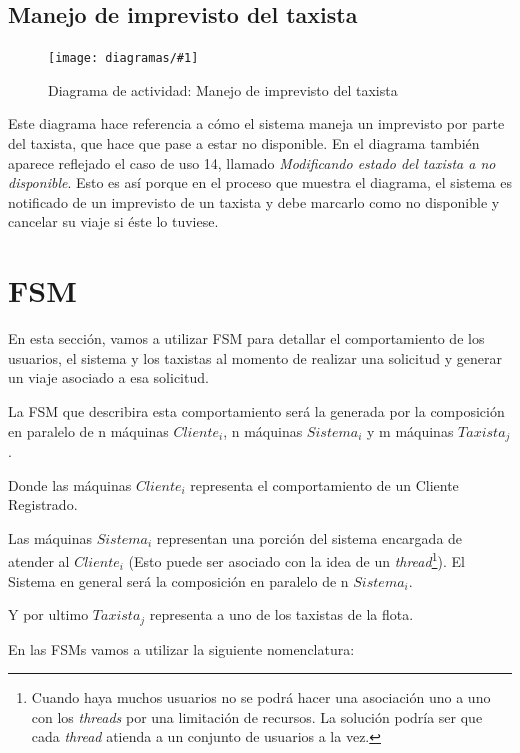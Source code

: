 \documentclass[a4paper, 10pt, twoside]{article}
\newcommand{\diagramavfig}[2]{%
  \begin{figure}[H]
    \texttt{[image: diagramas/\#1]}%
    \caption{#2}
    \label{fig:#1}
  \end{figure}
}
\begin{document}
\subsection{Manejo de imprevisto del taxista}
\label{sec:¡mprevisto-taxista}
\diagramavfig{da-imprevisto}{Diagrama de actividad: Manejo de imprevisto del taxista}

Este diagrama hace referencia a cómo el sistema maneja un imprevisto por parte del taxista, que hace que pase a estar no disponible. En el diagrama también aparece reflejado el caso de uso 14, llamado \emph{Modificando estado del taxista a no disponible}. Esto es así porque en el proceso que muestra el diagrama, el sistema es notificado de un imprevisto de un taxista y debe marcarlo como no disponible y cancelar su viaje si éste lo tuviese.

\section{FSM}

En esta sección, vamos a utilizar FSM para detallar el comportamiento de los usuarios, el sistema y los taxistas al momento de realizar una solicitud y generar un viaje asociado a esa solicitud.

La FSM que describira esta comportamiento ser\'a la generada por la composici\'on en paralelo de n m\'aquinas $Cliente_i$, n m\'aquinas $Sistema_i$ y m m\'aquinas $Taxista_j$.

Donde las m\'aquinas $Cliente_i$ representa el comportamiento de un Cliente Registrado.

Las m\'aquinas $Sistema_i$ representan una porci\'on del sistema encargada de atender al $Cliente_i$ (Esto puede ser asociado con la idea de un \emph{thread}\footnote{Cuando haya muchos usuarios no se podrá hacer una asociación uno a uno con los \emph{threads} por una limitación de recursos. La solución podría ser que cada \emph{thread} atienda a un conjunto de usuarios a la vez.}). El Sistema en general ser\'a la composici\'on en paralelo de n $Sistema_i$.

Y por ultimo $Taxista_j$ representa a uno de los taxistas de la flota.

En las FSMs vamos a utilizar la siguiente nomenclatura:
\end{document}
